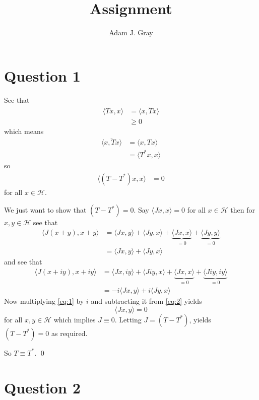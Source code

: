 \documentclass{unswmaths}
\begin{document}
\author{Adam J. Gray}
\title{Assignment}
\subject{Functional Analysis}

\unswtitle
\unswantiplagdec
\section*{Question 1}
See that
\begin{align*}
	\langle Tx, x \rangle &= \overline{\langle x, Tx \rangle} \\
		&\geq 0
\end{align*}
which means
\begin{align*}
	\overline{\langle x, Tx \rangle} &= \langle x, Tx \rangle \\
	    &= \langle T^* x, x \rangle
\end{align*}
so
\begin{align*}
	\langle (T - T^*)x, x \rangle &= 0
\end{align*}
for all $ x \in \mathcal{H} $.

We just want to show that $ (T - T^*) = 0 $. 
Say $ \langle Jx, x \rangle  = 0 $ for all $ x \in \mathcal{H} $ 
then for $ x, y \in \mathcal{H} $ see that 
\begin{align}
    \langle J(x + y), x + y \rangle &= \langle Jx, y \rangle 
        + \langle Jy, x \rangle + \underbrace{\langle Jx, x \rangle}_{=0}
        + \underbrace{\langle Jy, y \rangle}_{=0} \nonumber \\
        \label{eq:1}
        &= \langle Jx, y \rangle + \langle Jy, x \rangle
\end{align}
and see that
\begin{align} 
    \langle J(x + iy), x + iy \rangle &= \langle Jx, iy \rangle 
        + \langle Jiy, x \rangle + \underbrace{\langle Jx, x \rangle}_{=0}
        + \underbrace{\langle Jiy, iy \rangle}_{=0} \nonumber \\
        &= -i\langle Jx, y \rangle + i\langle Jy, x \rangle  
        \label{eq:2}
\end{align}
Now multiplying \eqref{eq:1} by $ i $ and subtracting it from \eqref{eq:2} yields
$$
    \langle Jx, y \rangle = 0
$$
for all $ x, y \in \mathcal{H} $ which implies $ J \equiv 0 $.
Letting $ J = (T - T^*) $, yields $ (T - T^*) = 0 $ as required.

So $ T \equiv T^* $. \qed
\newpage
\section*{Question 2}
\end{document}
